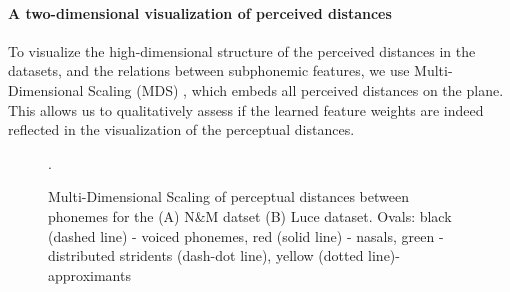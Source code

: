 \paragraph{A two-dimensional visualization of perceived distances} To visualize the high-dimensional structure of the perceived distances in the datasets, and the relations between subphonemic features, we use Multi-Dimensional Scaling (MDS) \citep{kruskal1964}, which embeds all perceived distances on the plane. This allows us to qualitatively assess if the learned feature weights are indeed reflected in the visualization of the perceptual distances.

\begin{figure}
\caption{Multi-Dimensional Scaling of perceptual distances between phonemes for the  (A) N\&M datset (B) Luce dataset. Ovals: black (dashed line) - voiced phonemes, red (solid line) - nasals, green - distributed stridents (dash-dot line), yellow (dotted line)- approximants}.
\end{figure}


